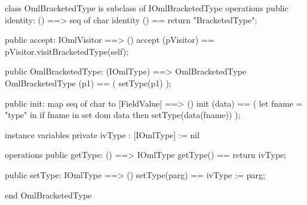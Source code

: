 \begin{vdm_al}
class OmlBracketedType is subclass of IOmlBracketedType
operations
  public identity: () ==> seq of char
  identity () == return "BracketedType";

  public accept: IOmlVisitor ==> ()
  accept (pVisitor) == pVisitor.visitBracketedType(self);

  public OmlBracketedType:
      (IOmlType) ==> OmlBracketedType
  OmlBracketedType (p1) == 
   ( setType(p1) );

  public init: map seq of char to [FieldValue] ==> ()
  init (data) ==
    ( let fname = "type" in
        if fname in set dom data
        then setType(data(fname)) );

instance variables
  private ivType : [IOmlType] := nil

operations
  public getType: () ==> IOmlType
  getType() == return ivType;

  public setType: IOmlType ==> ()
  setType(parg) == ivType := parg;

end OmlBracketedType
\end{vdm_al}

